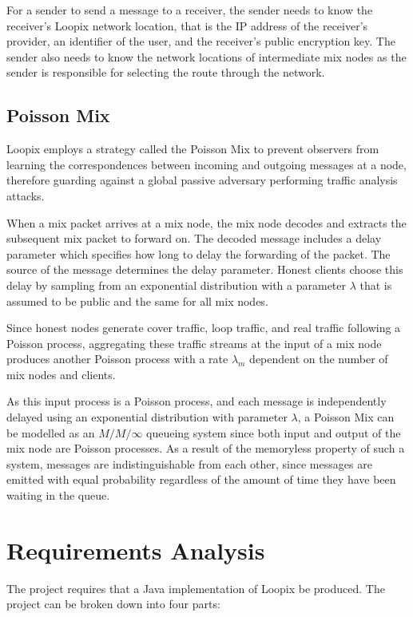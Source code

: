 \documentclass[final,dissertation.tex]{subfiles}
\begin{document}
For a sender to send a message to a receiver, the sender needs to know the receiver's Loopix network location, that is the IP address of the receiver's provider, an identifier of the user, and the receiver's public encryption key. The sender also needs to know the network locations of intermediate mix nodes as the sender is responsible for selecting the route through the network.

\subsection{Poisson Mix}

Loopix employs a strategy called the Poisson Mix to prevent observers from learning the correspondences between incoming and outgoing messages at a node, therefore guarding against a global passive adversary performing traffic analysis attacks. 

When a mix packet arrives at a mix node, the mix node decodes and extracts the subsequent mix packet to forward on. The decoded message includes a delay parameter which specifies how long to delay the forwarding of the packet. The source of the message determines the delay parameter. Honest clients choose this delay by sampling from an exponential distribution with a parameter $\lambda$ that is assumed to be public and the same for all mix nodes.

Since honest nodes generate cover traffic, loop traffic, and real traffic following a Poisson process, aggregating these traffic streams at the input of a mix node produces another Poisson process with a rate $\lambda_m$ dependent on the number of mix nodes and clients.

As this input process is a Poisson process, and each message is independently delayed using an exponential distribution with parameter $\lambda$, a Poisson Mix can be modelled as an $M/M/\infty$ queueing system since both input and output of the mix node are Poisson processes. As a result of the memoryless property of such a system, messages are indistinguishable from each other, since messages are emitted with equal probability regardless of the amount of time they have been waiting in the queue.

\section{Requirements Analysis}

The project requires that a Java implementation of Loopix be produced. The project can be broken down into four parts:
\end{document}
